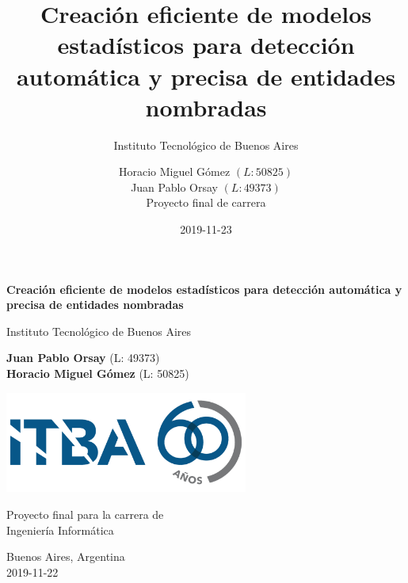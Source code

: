 \documentclass[12pt,a4paper,]{scrartcl}
\title{Creación eficiente de modelos estadísticos para detección automática y precisa de entidades nombradas}
\subtitle{Instituto Tecnológico de Buenos Aires}
\author{Horacio Miguel Gómez \((L:50825)\) \\ Juan Pablo Orsay \((L:49373)\) \\ Proyecto final de carrera}
\date{2019-11-23}
\let\oldmaketitle\maketitle
\begin{document}
\maketitle

\begin{titlepage}
    \begin{center}
        \vspace*{1cm}

        \Huge
        \textbf{Creación eficiente de modelos estadísticos para detección automática y precisa de entidades nombradas}

        \vspace{0.5cm}
        \LARGE
        Instituto Tecnológico de Buenos Aires

        \vspace{1.5cm}

        \textbf{Juan Pablo Orsay} (L: 49373)\\
        \textbf{Horacio Miguel Gómez} (L: 50825)

        \vfill

        \includegraphics[width=0.6\textwidth]{assets/logoItba}

        \vspace{0.8cm}

        Proyecto final para la carrera de\\
        Ingeniería Informática

        \vspace{0.8cm}

        \Large
        Buenos Aires, Argentina\\
        2019-11-22

    \end{center}
\end{titlepage}

\let\maketitle\oldmaketitle
\end{document}
